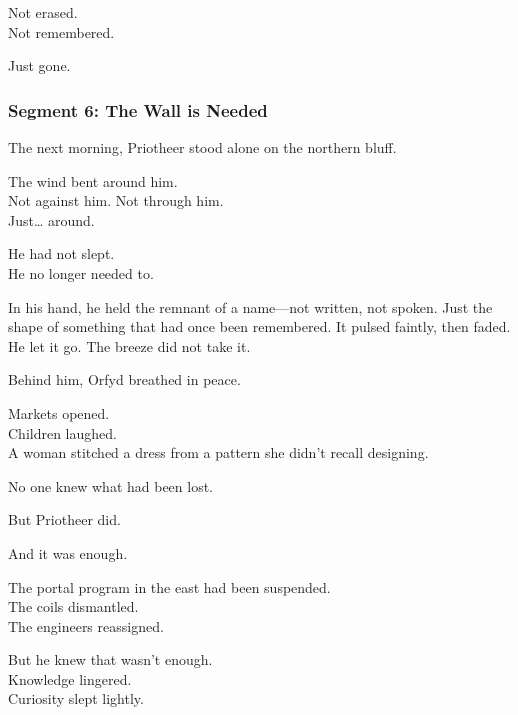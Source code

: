 \documentclass[9pt]{article}
\begin{document}
\vspace{0.5em}
Not erased.\\
Not remembered.

\vspace{0.5em}
Just gone.

\newpage

\subsubsection*{Segment 6: The Wall is Needed}

The next morning, Priotheer stood alone on the northern bluff.

\vspace{0.5em}
The wind bent around him.\\
Not against him. Not through him.\\
Just\ldots{} around.

\vspace{0.5em}
He had not slept.\\
He no longer needed to.

\vspace{0.5em}
In his hand, he held the remnant of a name---not written, not spoken. Just the shape of something that had once been remembered. It pulsed faintly, then faded. He let it go. The breeze did not take it.

\vspace{0.5em}
Behind him, Orfyd breathed in peace.

\vspace{0.5em}
Markets opened.\\
Children laughed.\\
A woman stitched a dress from a pattern she didn’t recall designing.

\vspace{0.5em}
No one knew what had been lost.

\vspace{0.5em}
But Priotheer did.

\vspace{0.5em}
And it was enough.

\vspace{0.5em}
The portal program in the east had been suspended.\\
The coils dismantled.\\
The engineers reassigned.

\vspace{0.5em}
But he knew that wasn’t enough.\\
Knowledge lingered.\\
Curiosity slept lightly.
\end{document}
